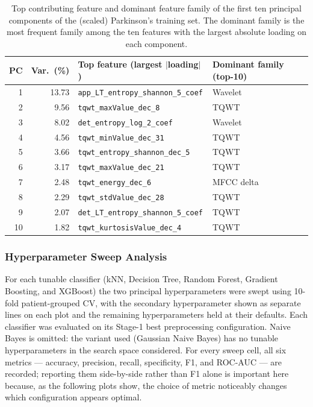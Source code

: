 \documentclass[11pt,a4paper]{article}
\begin{document}
\begin{table}[H]
    \centering
    \caption{Top contributing feature and dominant feature family of the
    first ten principal components of the (scaled) Parkinson's training
    set. The dominant family is the most frequent family among the ten
    features with the largest absolute loading on each component.}
    \label{tab:pd_pc_loadings}
    \begin{tabular}{rrll}
        \toprule
        PC & Var.\ (\%) & Top feature (largest $|$loading$|$) & Dominant family (top-10) \\
        \midrule
        1  & 13.73 & \texttt{app\_LT\_entropy\_shannon\_5\_coef} & Wavelet     \\
        2  & 9.56  & \texttt{tqwt\_maxValue\_dec\_8}             & TQWT        \\
        3  & 8.02  & \texttt{det\_entropy\_log\_2\_coef}         & Wavelet     \\
        4  & 4.56  & \texttt{tqwt\_minValue\_dec\_31}            & TQWT        \\
        5  & 3.66  & \texttt{tqwt\_entropy\_shannon\_dec\_5}     & TQWT        \\
        6  & 3.17  & \texttt{tqwt\_maxValue\_dec\_21}            & TQWT        \\
        7  & 2.48  & \texttt{tqwt\_energy\_dec\_6}               & MFCC delta  \\
        8  & 2.29  & \texttt{tqwt\_stdValue\_dec\_28}            & TQWT        \\
        9  & 2.07  & \texttt{det\_LT\_entropy\_shannon\_5\_coef} & TQWT        \\
        10 & 1.82  & \texttt{tqwt\_kurtosisValue\_dec\_4}        & TQWT        \\
        \bottomrule
    \end{tabular}
\end{table}

\subsubsection{Hyperparameter Sweep Analysis}\label{sec:pd_sweeps}

For each tunable classifier (kNN, Decision Tree, Random Forest, Gradient
Boosting, and XGBoost) the two principal hyperparameters were swept using
10-fold patient-grouped CV, with the secondary hyperparameter shown as
separate lines on each plot and the remaining hyperparameters held at their
defaults. Each classifier was evaluated on its Stage-1 best preprocessing
configuration. Naive Bayes is omitted: the variant used (Gaussian Naive
Bayes) has no tunable hyperparameters in the search space considered. For
every sweep cell, all six metrics --- accuracy, precision, recall,
specificity, F1, and ROC-AUC --- are recorded; reporting them side-by-side
rather than F1 alone is important here because, as the following plots show,
the choice of metric noticeably changes which configuration appears optimal.
\end{document}
